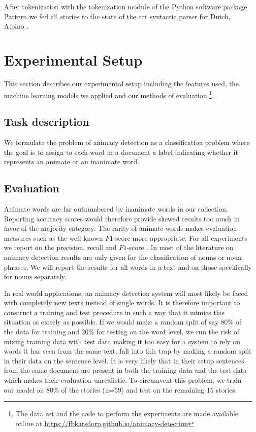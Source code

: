 \documentclass[a4paper,UKenglish]{oasics}
\begin{document}
After tokenization with the tokenization module of the Python software
package Pattern \cite{smedt:12} we fed all stories to the
state of the art syntactic parser for Dutch, Alpino \cite{bouma:01}.

\section{Experimental Setup}\label{sec:models}
This section describes our experimental setup including the features
used, the machine learning models we applied and our methods of
evaluation.\footnote{The data set and the code to perform the
  experiments are made available online at
  \url{https://fbkarsdorp.github.io/animacy-detection}}.

\subsection{Task description}

We formulate the problem of animacy detection as a classification
problem where the goal is to assign to each word in a document a label
indicating whether it represents an animate or an inanimate word.

\subsection{Evaluation}

Animate words are far outnumbered by inanimate words in our
collection. Reporting accuracy scores would therefore provide skewed
results too much in favor of the majority category. The rarity of
animate words makes evaluation measures such as the well-known $F1$-score
more appropriate. For all experiments we report on the precision,
recall and $F1$-score \cite{rijsbergen:79}. In most of the literature on
animacy detection results are only given for the classification of
nouns or noun phrases. We will report the results for all words in a
text and on those specifically for nouns separately.

In real world applications, an animacy detection system will most
likely be faced with completely new texts instead of single words. It
is therefore important to construct a training and test procedure in
such a way that it mimics this situation as closely as possible. If we
would make a random split of say 80\% of the data for training and
20\% for testing on the word level, we run the risk of mixing training
data with test data making it too easy for a system to rely on words
it has seen from the same text. \cite{bowman:12} fall into this trap
by making a random split in their data on the sentence level. It is
very likely that in their setup sentences from the same document are
present in both the training data and the test data which makes their
evaluation unrealistic. To circumvent this problem, we train our model
on 80\% of the stories (n=59) and test on the remaining 15 stories.
\end{document}
